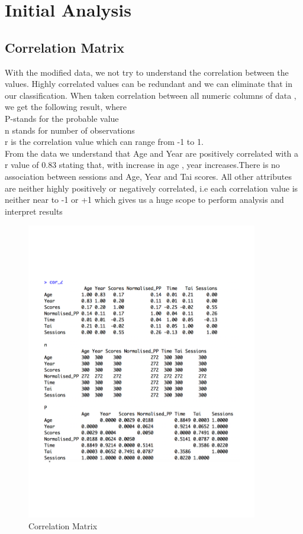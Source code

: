 \documentclass[12pt,epsf]{report}
\begin{document}
{\section*{Initial Analysis}
\FloatBarrier
\subsection*{Correlation Matrix}
With the modified data, we not try to understand the correlation between the values. Highly correlated values can be redundant and we can eliminate that in our classification. When taken correlation between all numeric columns of data , we get the following result, where\\
P-stands for the probable value\\
n stands for number of observations \\
r is the correlation value which can range from -1 to 1.\\
From the data we understand that Age and Year are positively correlated with a r value of 0.83 stating that, with increase in age , year increases.There is no association between sessions and Age, Year and Tai scores. All other attributes are neither highly positively or negatively correlated, i.e each correlation value is neither near to -1 or +1 which gives us a huge scope to perform analysis and interpret results\\
\begin{figure}[!htb]
	\includegraphics[width=0.9\textwidth]{Correlation_Data.pdf}
	\caption{Correlation Matrix}
\end{figure}
\FloatBarrier
}
\end{document}
